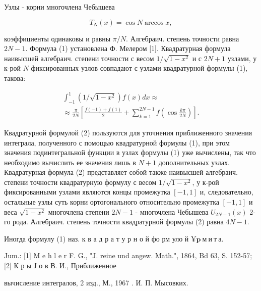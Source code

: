 \documentclass[10pt]{article}
\begin{document}
Узлы - корни многочлена Чебышева



\[

T_{N}(x)=\cos N \arccos x,

\]



коэффициенты одинаковы и равны $\pi / N$. Алгебраич. степень точности равна $2 N-1$. Формула (1) установлена Ф. Мелером [1]. Квадратурная формула наивысшей алгебраич. степени точности с весом $1 / \sqrt{1-x^{2}}$ и с $2 N+1$ узлами, у к-рой $N$ фиксированных узлов совпадают с узлами квадратурной формулы (1), такова:



\[

\begin{gathered}

\int_{-1}^{1}\left(1 / \sqrt{1-x^{2}}\right) f(x) d x \approx \\

\approx \frac{\pi}{2 N}\left[\frac{f(-1)+f(1)}{2}+\sum_{k=1}^{2 N-1} f\left(\cos \frac{k \pi}{2 N}\right)\right] .

\end{gathered}

\]



Квадратурной формулой (2) пользуются для уточнения приближенного значения интеграла, полученного с помощью квадратурной формулы (1), при этом значения подинтегральной функции в узлах формулы (1) уже вычислены, так что необходимо вычислить ее значения лишь в $N+1$ дополнительных узлах. Квадратурная формула (2) представляет собой также наивысшей алгебраич. степени точности квадратурную формулу с весом $1 / \sqrt{1-x^{2}}$, у к-рой фиксированными узлами являются концы промежутка $[-1,1]$ и, следовательно, остальные узлы суть корни ортогонального относительно промежутка $[-1,1]$ и веса $\sqrt{1-x^{2}}$ многочлена степени $2 N-1$ - многочлена Чебышева $U_{2 N-1}(x)$ 2-го рода. Алгебраич. степень точности квадратурной формулы (2) равна $4 N-1$.



Иногда формулу (1) наз. к в а д р а т у р н о й фо рм уло й $¥ \mathbf{p} \mathbf{~ м ~ и ~ т ~ а . ~}$



Jum.: [1] M e h l e r F. G., "J. reine und angew. Math.", 1864, Bd 63, S. 152-57; [2] К р ы Ј о в В. И., Приближенное

вычисление интегралов, 2 изд., М., 1967 . И. П. Мысовких.
\end{document}
